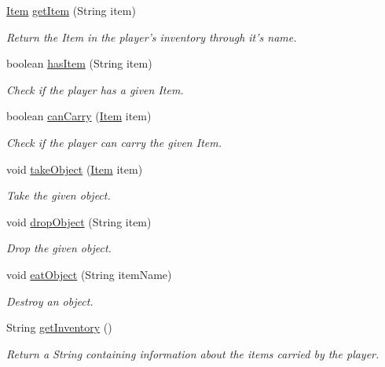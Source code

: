 \begin{DoxyCompactItemize}
\hyperlink{classpkg__world_1_1pkg__items_1_1Item}{Item} \hyperlink{classpkg__world_1_1Player_a913aab92cf289f5278e6e995e7a4d118}{get\-Item} (String item)
\begin{DoxyCompactList}\small\item\em Return the Item in the player's inventory through it's name. \end{DoxyCompactList}\item 
boolean \hyperlink{classpkg__world_1_1Player_a23b53a36fdac45868ee1ea6dcdeca7ce}{has\-Item} (String item)
\begin{DoxyCompactList}\small\item\em Check if the player has a given Item. \end{DoxyCompactList}\item 
boolean \hyperlink{classpkg__world_1_1Player_acca13cc67931809c8067aaca1b8c8459}{can\-Carry} (\hyperlink{classpkg__world_1_1pkg__items_1_1Item}{Item} item)
\begin{DoxyCompactList}\small\item\em Check if the player can carry the given Item. \end{DoxyCompactList}\item 
void \hyperlink{classpkg__world_1_1Player_ac5bdaa8f2149e480e57398be03efa96f}{take\-Object} (\hyperlink{classpkg__world_1_1pkg__items_1_1Item}{Item} item)
\begin{DoxyCompactList}\small\item\em Take the given object. \end{DoxyCompactList}\item 
void \hyperlink{classpkg__world_1_1Player_a202b660b747a977911af058554888387}{drop\-Object} (String item)
\begin{DoxyCompactList}\small\item\em Drop the given object. \end{DoxyCompactList}\item 
void \hyperlink{classpkg__world_1_1Player_ab18847eb6503ad2ac400cc7cd5a7c9a0}{eat\-Object} (String item\-Name)
\begin{DoxyCompactList}\small\item\em Destroy an object. \end{DoxyCompactList}\item 
String \hyperlink{classpkg__world_1_1Player_a2a6e491f41e159bbac42022e55df2d52}{get\-Inventory} ()
\begin{DoxyCompactList}\small\item\em Return a String containing information about the items carried by the player. \end{DoxyCompactList}\end{DoxyCompactItemize}
